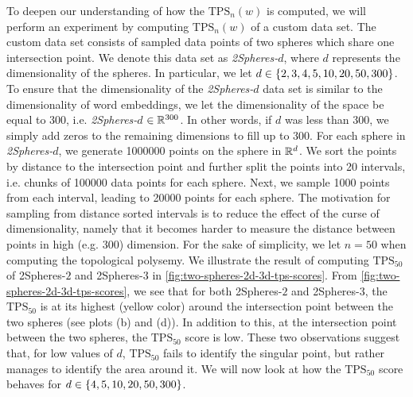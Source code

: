 To deepen our understanding of how the $\text{TPS}_n(w)$ is computed, we will perform an experiment by computing $\text{TPS}_n(w)$ of a custom data set. The custom data set consists of sampled data points of two spheres which share one intersection point. We denote this data set as \textit{2Spheres-$d$}, where $d$ represents the dimensionality of the spheres. In particular, we let $d \in \left\{2, 3, 4, 5, 10, 20, 50, 300\right\}$. To ensure that the dimensionality of the \textit{2Spheres-$d$} data set is similar to the dimensionality of word embeddings, we let the dimensionality of the space be equal to 300, i.e. \textit{2Spheres-$d$} $\in \mathbb{R}^{300}$. In other words, if $d$ was less than 300, we simply add zeros to the remaining dimensions to fill up to 300. For each sphere in \textit{2Spheres-$d$}, we generate 1000000 points on the sphere in $\mathbb{R}^d$. We sort the points by distance to the intersection point and further split the points into 20 intervals, i.e. chunks of 100000 data points for each sphere. Next, we sample 1000 points from each interval, leading to 20000 points for each sphere. The motivation for sampling from distance sorted intervals is to reduce the effect of the curse of dimensionality, namely that it becomes harder to measure the distance between points in high (e.g. 300) dimension. For the sake of simplicity, we let $n=50$ when computing the topological polysemy. We illustrate the result of computing $\text{TPS}_{50}$ of 2Spheres-$2$ and 2Spheres-$3$ in \cref{fig:two-spheres-2d-3d-tps-scores}. From \cref{fig:two-spheres-2d-3d-tps-scores}, we see that for both 2Spheres-$2$ and 2Spheres-$3$, the $\text{TPS}_{50}$ is at its highest (yellow color) around the intersection point between the two spheres (see plots (b) and (d)). In addition to this, at the intersection point between the two spheres, the $\text{TPS}_{50}$ score is low. These two observations suggest that, for low values of $d$, $\text{TPS}_{50}$ fails to identify the singular point, but rather manages to identify the area around it. We will now look at how the $\text{TPS}_{50}$ score behaves for $d \in \left\{4, 5, 10, 20, 50, 300\right\}$.
